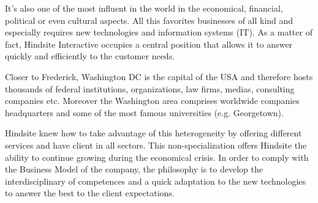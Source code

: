 It’s also one of the most influent in the world in the economical, financial,
political or even cultural aspects. All this favorites businesses of all kind and
especially requires new technologies and information systems (IT). As a
matter of fact, Hindsite Interactive occupies a central position that allows it to
answer quickly and efficiently to the customer needs.

Closer to Frederick, Washington DC is the capital of the USA and therefore
hosts thousands of federal institutions, organizations, law firms, medias,
consulting companies etc. Moreover the Washington area comprises
worldwide companies headquarters and some of the most famous universities
(e.g. Georgetown).

Hindsite knew how to take advantage of this heterogeneity by offering different
services and have client in all sectors. This non-specialization offers Hindsite
the ability to continue growing during the economical crisis.
In order to comply with the Business Model of the company, the philosophy is
to develop the interdisciplinary of competences and a quick adaptation to the
new technologies to answer the best to the client expectations.

\clearpage